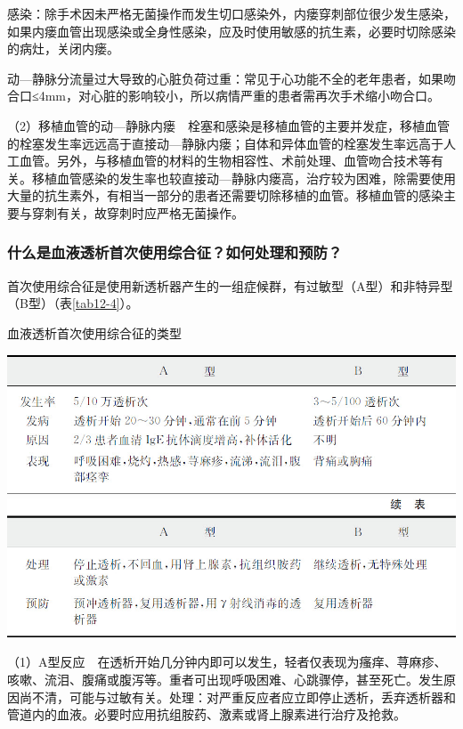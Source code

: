 感染：除手术因未严格无菌操作而发生切口感染外，内瘘穿刺部位很少发生感染，如果内瘘血管出现感染或全身性感染，应及时使用敏感的抗生素，必要时切除感染的病灶，关闭内瘘。

动---静脉分流量过大导致的心脏负荷过重：常见于心功能不全的老年患者，如果吻合口≤4mm，对心脏的影响较小，所以病情严重的患者需再次手术缩小吻合口。

（2）移植血管的动---静脉内瘘　栓塞和感染是移植血管的主要并发症，移植血管的栓塞发生率远远高于直接动---静脉内瘘；自体和异体血管的栓塞发生率远高于人工血管。另外，与移植血管的材料的生物相容性、术前处理、血管吻合技术等有关。移植血管感染的发生率也较直接动---静脉内瘘高，治疗较为困难，除需要使用大量的抗生素外，有相当一部分的患者还需要切除移植的血管。移植血管的感染主要与穿刺有关，故穿刺时应严格无菌操作。

\subsubsection{什么是血液透析首次使用综合征？如何处理和预防？}

首次使用综合征是使用新透析器产生的一组症候群，有过敏型（A型）和非特异型（B型）（表\ref{tab12-4}）。

\begin{table}[htbp]
\centering
\caption{血液透析首次使用综合征的类型}
\label{tab12-4}
\includegraphics[width=\textwidth,height=\textheight,keepaspectratio]{./images/Image00100.jpg}
\includegraphics[width=\textwidth,height=\textheight,keepaspectratio]{./images/Image00101.jpg}
\end{table}

（1）A型反应　在透析开始几分钟内即可以发生，轻者仅表现为瘙痒、荨麻疹、咳嗽、流泪、腹痛或腹泻等。重者可出现呼吸困难、心跳骤停，甚至死亡。发生原因尚不清，可能与过敏有关。处理：对严重反应者应立即停止透析，丢弃透析器和管道内的血液。必要时应用抗组胺药、激素或肾上腺素进行治疗及抢救。

